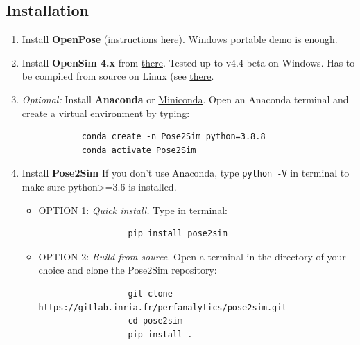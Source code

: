 \subsection{Installation}

\begin{enumerate}[itemsep=0em, topsep=0em, leftmargin=*]
      \item Install \textbf{OpenPose} (instructions \href{https://github.com/CMU-Perceptual-Computing-Lab/openpose/blob/master/doc/installation/0_index.md}{here}).\newline
      Windows portable demo is enough.
      \item Install \textbf{OpenSim 4.x} from \href{https://simtk.org/frs/index.php?group_id=91}{there}.\newline
      Tested up to v4.4-beta on Windows. Has to be compiled from source on Linux (see \href{https://simtk-confluence.stanford.edu:8443/display/OpenSim/Linux+Support}{there}.
      \item \textit{Optional:} Install \textbf{Anaconda} or \href{https://docs.conda.io/en/latest/miniconda.html}{Miniconda}.\newline
      Open an Anaconda terminal and create a virtual environment by typing:
      \begin{verbatim}
            conda create -n Pose2Sim python=3.8.8
            conda activate Pose2Sim
      \end{verbatim}
      \item Install \textbf{Pose2Sim}\newline
      If you don't use Anaconda, type \texttt{python -V} in terminal to make sure python>=3.6 is installed.
      \begin{itemize}
            \item OPTION 1: \textit{Quick install.} Type in terminal:
            \begin{verbatim}
                  pip install pose2sim
            \end{verbatim}
            \item OPTION 2: \textit{Build from source.} Open a terminal in the directory of your choice and clone the Pose2Sim repository:
            \begin{verbatim}
                  git clone https://gitlab.inria.fr/perfanalytics/pose2sim.git
                  cd pose2sim
                  pip install .
            \end{verbatim}
      \end{itemize}
\end{enumerate}


